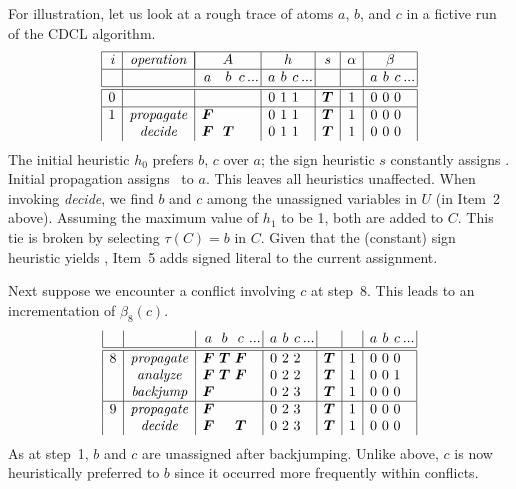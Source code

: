 For illustration,
let us look at a rough trace of atoms $a$, $b$, and $c$ in a fictive run of the CDCL algorithm.
\[
\begin{array}{|r|c|c@{\ }@{\ }c@{\,}@{\,}c@{\,}r@{\,}|c@{\,}@{\,}c@{\,}@{\,}c@{\,}r@{\,}|c|c|c@{\,}@{\,}c@{\,}@{\,}c@{\,}r@{\,}|}
  \hline
  i&\mathit{operation}&
  \multicolumn{4}{|c|}{\ass}&
  \multicolumn{4}{ c|}{h}&
                       s &
                       \alpha &
  \multicolumn{4}{ c|}{\beta}\\
  \hline
   &                  &a     &b    &c&...&a&b&c   &...&     &  &a&b&c&...\\
  \hline
  \hline
  0&                  &      &     & &   &0&1&1   &   &\true&1 &0&0&0&   \\
  \hline
  1&\mathit{propagate}&\false&     & &   &0&1&1   &   &\true&1 &0&0&0&   \\
   &\mathit{decide}   &\false&\true& &   &0&1&1   &   &\true&1 &0&0&0&   
\end{array}
\]
The initial heuristic $h_0$ prefers $b$, $c$ over $a$;
the sign heuristic $s$ constantly assigns \true.
Initial propagation assigns \false\ to $a$.
This leaves all heuristics unaffected.
When invoking \textit{decide}, we find $b$ and $c$ among the unassigned variables in $U$
(in Item~2 above).
Assuming the maximum value of $h_1$ to be 1, both are added to $C$.
This tie is broken by selecting $\tau(C)=b$ in $C$.
Given that the (constant) sign heuristic yields \true,
Item~5 adds signed literal  to the current assignment.

Next suppose we encounter a conflict involving $c$ at step~8.
This leads to an incrementation of $\beta_8(c)$.
\[
\begin{array}{|r|c|c@{\,}@{\,}c@{\,}@{\,}c@{\,}r@{\,}|c@{\,}@{\,}c@{\,}@{\,}c@{\,}r@{\,}|c|c|c@{\,}@{\,}c@{\,}@{\,}c@{\,}r@{\,}|}
   &                  &a     &b    &c     &...&a&b&c   &...&     &  &a&b&c&...\\
  \hline
  \hline
  8&\mathit{propagate}&\false&\true&\false&   &0&2&2   &   &\true&1 &0&0&0&   \\
   &\mathit{analyze}  &\false&\true&\false&   &0&2&2   &   &\true&1 &0&0&1&   \\
   &\mathit{backjump} &\false&     &      &   &0&2&3   &   &\true&1 &0&0&0&   \\
  \hline
  9&\mathit{propagate}&\false&     &      &   &0&2&3   &   &\true&1 &0&0&0&   \\
   &\mathit{decide}   &\false&     &\true &   &0&2&3   &   &\true&1 &0&0&0&
\end{array}
\]
As at step~1, $b$ and $c$ are unassigned after backjumping.
Unlike above, $c$ is now heuristically preferred to $b$ since it occurred more frequently within conflicts.

